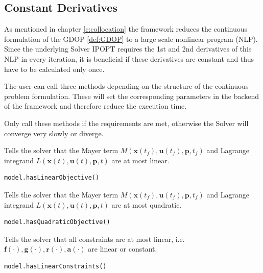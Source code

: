 \documentclass[12pt]{article}
\renewcommand{\v}{\bm}
\begin{document}
	\subsection{Constant Derivatives}
	As mentioned in chapter \ref{c:collocation} the framework reduces the continuous formulation of the GDOP \ref{def:GDOP} to a large scale nonlinear program (NLP). Since the underlying Solver IPOPT requires the 1st and 2nd derivatives of this NLP in every iteration, it is beneficial if these derivatives are constant and thus have to be calculated only once. 
	
	The user can call three methods depending on the structure of the continuous problem formulation. These will set the corresponding parameters in the backend of the framework and therefore reduce the execution time. 
	
	Only call these methods if the requirements are met, otherwise the Solver will converge very slowly or diverge.
	
	\begin{mdframed}[backgroundcolor=gray!10, roundcorner=10pt, linewidth=1pt]
		
		Tells the solver that the Mayer term $M(\v{x}(t_f), \v{u}(t_f), \v{p}, t_f)$ and Lagrange integrand $L(\v{x}(t), \v{u}(t), \v{p}, t)$ are at most linear.
		
		\begin{lstlisting}
model.hasLinearObjective()
		\end{lstlisting}
		\label{hasLinearObjective}
	\end{mdframed}


	\begin{mdframed}[backgroundcolor=gray!10, roundcorner=10pt, linewidth=1pt]
		
		Tells the solver that the Mayer term $M(\v{x}(t_f), \v{u}(t_f), \v{p}, t_f)$ and Lagrange integrand $L(\v{x}(t), \v{u}(t), \v{p}, t)$ are at most quadratic.
		
		\begin{lstlisting}
model.hasQuadraticObjective()
		\end{lstlisting}
		\label{hasQuadraticObjective}

	\end{mdframed}


	\begin{mdframed}[backgroundcolor=gray!10, roundcorner=10pt, linewidth=1pt]
	
		Tells the solver that all constraints are at most linear, i.e. $\v{f}(\cdot), \v{g}(\cdot), \v{r}(\cdot), \v{a}(\cdot)$ are linear or constant.
		
		\begin{lstlisting}
model.hasLinearConstraints()
		\end{lstlisting}
		\label{hasLinearConstraints}
		
	\end{mdframed}
\end{document}
